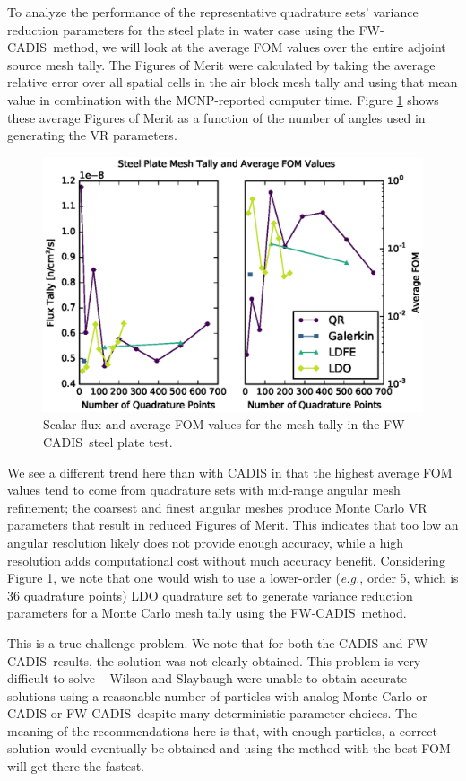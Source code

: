 \documentclass{article} %
\newcommand{\fwc}{\mbox{FW-CADIS}}
\begin{document}
To analyze the performance of the representative quadrature sets' variance
reduction parameters for the steel plate in water case using the \fwc\ method,
we will look at the average FOM values over the entire adjoint source mesh
tally. The Figures of Merit were calculated by taking the average relative
error over all spatial cells in the air block mesh tally and using that mean
value in combination with the MCNP-reported computer time. Figure 
\ref{steel-fwc} shows these average Figures of Merit as a function of the
number of angles used in generating the VR parameters.

\begin{figure}[!htb]
\centering
\includegraphics[max height=0.445\textheight]{steel-fwcadis.eps}
\caption{Scalar flux and average FOM values for the mesh tally in the \fwc\
         steel plate test.}
\label{steel-fwc}
\end{figure}

We see a different trend here than with CADIS in that the highest average FOM
values tend to come from quadrature sets with mid-range angular mesh
refinement; the coarsest and finest angular meshes produce Monte Carlo VR
parameters that result in reduced Figures of Merit. This indicates that too
low an angular resolution likely does not provide enough accuracy, while a
high resolution adds computational cost without much accuracy benefit.
Considering Figure \ref{steel-fwc}, we note that one would wish to use a
lower-order (\textit{e.g.}, order 5, which is 36 quadrature points) LDO
quadrature set to generate variance reduction parameters for a Monte Carlo
mesh tally using the \fwc\ method.

This is a true challenge problem. We note that for both the CADIS and \fwc\
results, the solution was not clearly obtained. This problem is very difficult
to solve -- Wilson and Slaybaugh \cite{wilsonslaybaugh} were unable to obtain
accurate solutions using a reasonable number of particles with analog Monte
Carlo or CADIS or \fwc\ despite many deterministic parameter choices. The
meaning of the recommendations here is that, with enough particles, a correct
solution would eventually be obtained and using the method with the best FOM
will get there the fastest. 
\end{document}
